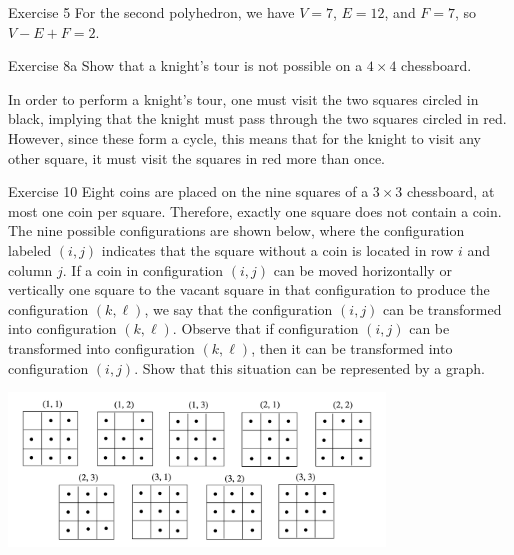 \documentclass[12pt]{extarticle}
\begin{document}
{\begin{problem}{Exercise 5}
    For the second polyhedron, we have $V = 7$, $E = 12$, and $F = 7$, so $V-E+F = 2$.
  \end{problem}
  \begin{problem}{Exercise 8a}
    Show that a knight's tour is not possible on a $4\times 4$ chessboard.
    \tcblower
    \begin{center}
    \end{center}
    In order to perform a knight's tour, one must visit the two squares circled in black, implying that the knight must pass through the two squares circled in red. However, since these form a cycle, this means that for the knight to visit any other square, it must visit the squares in red more than once.
  \end{problem}
  \begin{problem}{Exercise 10}
    Eight coins are placed on the nine squares of a $3\times 3$ chessboard, at most one coin per square. Therefore, exactly one square does not contain a coin. The nine possible configurations are shown below, where the configuration labeled $(i,j)$ indicates that the square without a coin is located in row $i$ and column $j$. If a coin in configuration $(i,j)$ can be moved horizontally or vertically one square to the vacant square in that configuration to produce the configuration $(k,\ell)$, we say that the configuration $(i,j)$ can be transformed into configuration $(k,\ell)$. Observe that if configuration $(i,j)$ can be transformed into configuration $(k,\ell)$, then it can be transformed into configuration $(i,j)$. Show that this situation can be represented by a graph.
    \begin{center}
      \includegraphics[width=10cm]{exercise_10}

\end{center}
\end{problem}}
\end{document}
